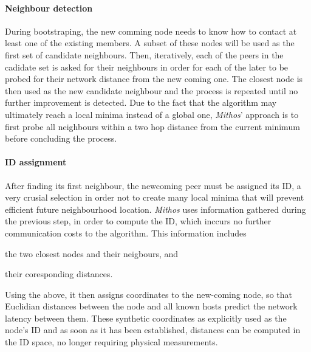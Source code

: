 \documentclass[a4paper,10pt]{article}
\begin{document}
\paragraph{Neighbour detection}
During bootstraping, the new comming node needs to know how to contact at least one of the existing members. A subset of these nodes will be used as the first set of candidate neighbours. Then, iteratively, each of the peers in the cadidate set is asked for their neighbours in order for each of the later to be probed for their network distance from the new coming one. The closest node is then used as the new candidate neighbour and the process is repeated until no further improvement is detected. Due to the fact that the algorithm may ultimately reach a local minima instead of a global one, \emph{Mithos}' approach is to first probe all neighbours within a two hop distance from the current minimum before concluding the process.

\paragraph{ID assignment}
After finding its first neighbour, the newcoming peer must be assigned its ID, a very crusial selection in order not to create many local minima that will prevent efficient future neighbourhood location. \emph{Mithos} uses information gathered during the previous step, in order to compute the ID, which inccurs no further communication costs to the algorithm. This information includes
\begin{inparaenum}
  \item the two closest nodes and their neigbours, and 
  \item their coresponding distances.
\end{inparaenum}
Using the above, it then assigns coordinates to the new-coming node, so that Euclidian distances between the node and all known hosts predict the network latency between them\cite{cox_vivaldi_2004}. These synthetic coordinates as explicitly used as the node's ID and as soon as it has been established, distances can be computed in the ID space, no longer requiring physical measurements.
\end{document}
